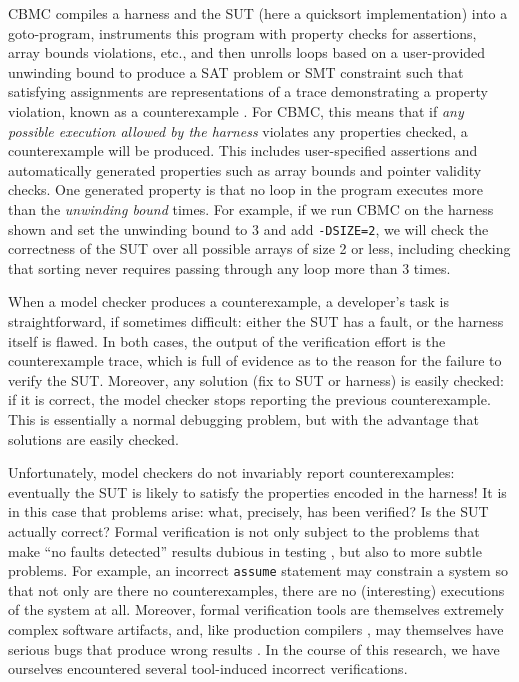 \documentclass{svjour3}
\begin{document}
CBMC compiles a harness and the SUT (here a quicksort implementation)
into a goto-program, instruments this program with property checks for
assertions, array bounds violations, etc., and then unrolls loops
based on a user-provided unwinding bound to produce a SAT
problem or SMT constraint such that satisfying assignments are
representations of a trace demonstrating a property violation, known
as a counterexample \cite{CountWitness}.  For CBMC, this means
that if \emph{any possible execution allowed by the harness} violates
any properties checked, a counterexample will be produced.  This
includes user-specified assertions and automatically generated
properties such as array bounds and pointer validity checks. One
generated property is that no loop in the program executes more than
the \emph{unwinding bound} times.  For example, if we run CBMC on the
harness shown and set the unwinding bound to 3 and add {\tt -DSIZE=2},
we will check the correctness of the SUT over all possible
  arrays of size 2 or less, including checking that sorting never
requires passing through any loop more than 3 times.

When a model checker produces a counterexample, a developer's task is
straightforward, if sometimes difficult: either the SUT has a fault,
or the harness itself is flawed.  In both cases, the output of the
verification effort is the counterexample trace, which is full of
evidence as to the reason for the failure to verify the SUT. Moreover,
any solution (fix to SUT or harness) is easily checked: if it is
correct, the model checker stops reporting the previous
counterexample.  
This is essentially a normal debugging problem, but
with the advantage that solutions are easily checked.

Unfortunately, model checkers do not invariably report
counterexamples: eventually the SUT is likely to satisfy the
properties encoded in the harness!  It is in this case that problems
arise: what, precisely, has been verified?  Is the SUT actually correct?
Formal verification is not only subject to the problems that make
``no faults detected'' results dubious in testing \cite{WODA09,CovDisc}, but
also to more subtle problems.  For example, an incorrect {\tt assume}
statement may constrain a system so that not only are there no
counterexamples, there are no (interesting) executions of the system at
all.  Moreover, formal verification tools are themselves extremely
complex software artifacts, and, like production compilers \cite{csmith}, may
themselves have serious bugs that produce wrong results
\cite{statanalbug}.  In the course of this research, we have ourselves
encountered several tool-induced incorrect verifications.
\end{document}
